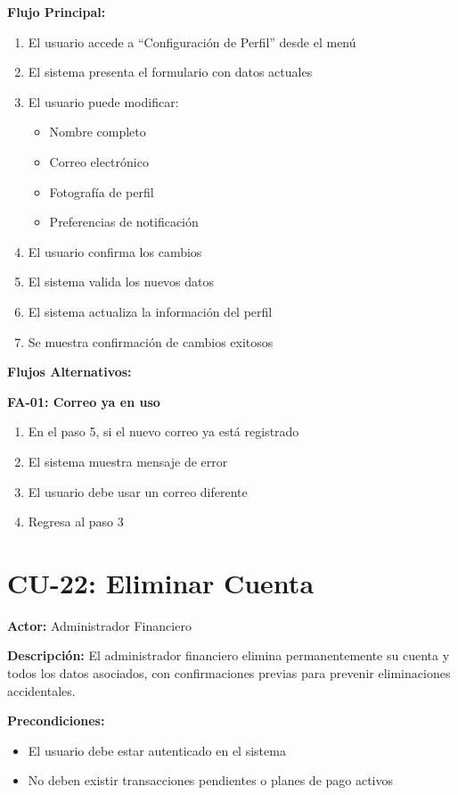 \noindent\textbf{Flujo Principal:}
\begin{enumerate}
    \item El usuario accede a ``Configuración de Perfil'' desde el menú
    \item El sistema presenta el formulario con datos actuales
    \item El usuario puede modificar:
    \begin{itemize}
        \item Nombre completo
        \item Correo electrónico
        \item Fotografía de perfil
        \item Preferencias de notificación
    \end{itemize}
    \item El usuario confirma los cambios
    \item El sistema valida los nuevos datos
    \item El sistema actualiza la información del perfil
    \item Se muestra confirmación de cambios exitosos
\end{enumerate}

\noindent\textbf{Flujos Alternativos:}

\textbf{FA-01: Correo ya en uso}
\begin{enumerate}
    \item En el paso 5, si el nuevo correo ya está registrado
    \item El sistema muestra mensaje de error
    \item El usuario debe usar un correo diferente
    \item Regresa al paso 3
\end{enumerate}

\section{CU-22: Eliminar Cuenta}

\noindent\textbf{Actor:} Administrador Financiero

\noindent\textbf{Descripción:} El administrador financiero elimina permanentemente su cuenta y todos los datos asociados, con confirmaciones previas para prevenir eliminaciones accidentales.

\noindent\textbf{Precondiciones:}
\begin{itemize}
    \item El usuario debe estar autenticado en el sistema
    \item No deben existir transacciones pendientes o planes de pago activos
\end{itemize}


